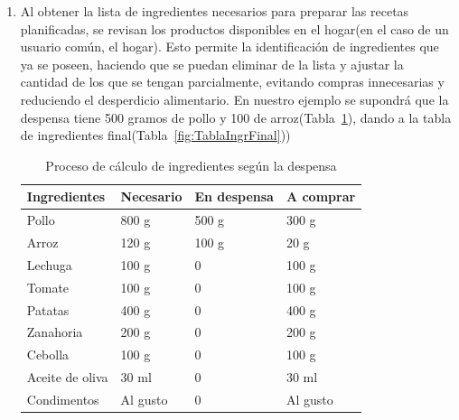 \documentclass[12pt,a4paper]{report} %
\begin{document}
\begin{enumerate}
		
		\item Al obtener la lista de ingredientes necesarios para preparar las recetas planificadas, se revisan los productos disponibles en el hogar(en el caso de un usuario común, el hogar). Esto permite la identificación de ingredientes que ya se poseen, haciendo que se puedan eliminar de la lista y ajustar la cantidad de los que se tengan parcialmente, evitando compras innecesarias y reduciendo el desperdicio alimentario. En nuestro ejemplo se supondrá que la despensa tiene 500 gramos de pollo y 100 de arroz(Tabla~\ref{fig:TablaCalculoIngr}), dando a la tabla de ingredientes final(Tabla~\ref{fig:TablaIngrFinal}))
		
		
		\begin{table}[H]
			\label{fig:TablaCalculoIngr}
			\centering
			\caption{Proceso de cálculo de ingredientes según la despensa}
			\begin{tabular}{|p{3cm}|p{3cm}|p{3cm}|p{3cm}|}
				\hline
				\textbf{Ingredientes} & \textbf{Necesario} & \textbf{En despensa} & \textbf{A comprar} \\ \hline
				Pollo & 800 g & 500 g & 300 g \\ \hline
				Arroz & 120 g & 100 g & 20 g \\ \hline
				Lechuga & 100 g & 0 & 100 g \\ \hline
				Tomate & 100 g & 0 & 100 g \\ \hline
				Patatas & 400 g & 0 & 400 g \\ \hline
				Zanahoria & 200 g & 0 & 200 g \\ \hline
				Cebolla & 100 g & 0 & 100 g \\ \hline
				Aceite de oliva & 30 ml & 0 & 30 ml \\ \hline
				Condimentos & Al gusto & 0 & Al gusto \\ \hline
			\end{tabular}
		\end{table}
		
		

\end{enumerate}
\end{document}
